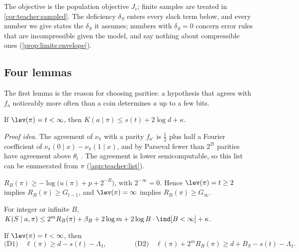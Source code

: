 The objective is the population objective $J_c$; finite samples are treated in \cref{cor:teacher:sampled}. The deficiency $\delta_S$ enters every slack term below, and every number we give states the $\delta_S$ it assumes; numbers with $\delta_S=0$ concern error rules that are incompressible given the model, and say nothing about compressible ones (\cref{prop:limits:envelope}).

\subsection{Four lemmas}\label{sec:teacher:lemmas}

The first lemma is the reason for choosing parities: a hypothesis that agrees with $f_a$ noticeably more often than a coin determines $a$ up to a few bits.

\begin{lemma}\label{lem:teacher:list}
If $\lev(\pi)=t<\infty$, then $K(a\mid\pi)\le s(t)+2\log d+\kappa$.
\end{lemma}

\emph{Proof idea.} The agreement of $\nu_\pi$ with a parity $f_{a'}$ is $\frac12$ plus half a Fourier coefficient of $\nu_\pi(0\mid x)-\nu_\pi(1\mid x)$, and by Parseval fewer than $2^{2t}$ parities have agreement above $\theta_t$ \citep{goldreich1989hard,kushilevitz1993learning}. The agreement is lower semicomputable, so this list can be enumerated from $\pi$ (\cref{app:teacher:list}).

\begin{lemma}\label{lem:teacher:floor}
$R_B(\pi)\ge-\log\big(u(\pi)+p+2^{-B}\big)$, with $2^{-\infty}=0$. Hence $\lev(\pi)=t\ge2$ implies $R_B(\pi)\ge G_{t-1}$, and $\lev(\pi)=\infty$ implies $R_B(\pi)\ge G_\infty$.
\end{lemma}

\begin{lemma}\label{lem:teacher:coding}
For integer or infinite $B$, $K(S\mid a,\pi)\le2^mR_B(\pi)+\beta_B+2\log m+2\log B\cdot\ind[B<\infty]+\kappa$.
\end{lemma}

\begin{lemma}\label{lem:teacher:twopart}
If $\lev(\pi)=t<\infty$, then
\[
\text{(D1)}\quad\ell(\pi)\ge d-s(t)-\Lambda_1,\qquad\qquad\text{(D2)}\quad\ell(\pi)+2^mR_B(\pi)\ge d+B_S-s(t)-\Lambda_1.
\]
\end{lemma}

